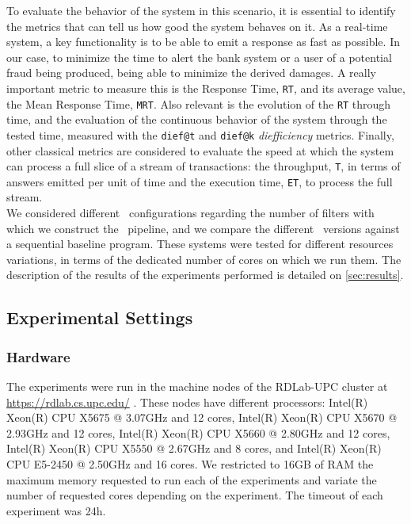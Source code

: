 To evaluate the behavior of the system in this scenario, it is essential to identify the metrics that can tell us how good the system behaves on it. As a real-time system, a key functionality is to be able to emit a response as fast as possible. In our case, to minimize the time to alert the bank system or a user of a potential fraud being produced, being able to minimize the derived damages. A really important metric to measure this is the Response Time, \texttt{RT}, and its average value, the Mean Response Time, \texttt{MRT}.
Also relevant is the evolution of the \texttt{RT} through time, and the evaluation of the continuous behavior of the system through the tested time, measured with the \texttt{dief@t} and \texttt{dief@k} \emph{diefficiency} metrics. Finally, other classical metrics are considered to evaluate the speed at which the system can process a full slice of a stream of transactions: 
the throughput, \texttt{T}, in terms of answers emitted per unit of time and the execution time, \texttt{ET}, to process the full stream. \\

We considered different \DPATM\ configurations regarding the number of filters with which we construct the \DP\ pipeline, 
and we compare the different \DP\ versions against a sequential baseline program. 
These systems were tested for different resources variations, in terms of the dedicated number of cores on which we run them. The description of the results of the experiments performed is detailed on \ref{sec:results}. 

\subsection{Experimental Settings}\label{exps:exps-settings}

\subsubsection{Hardware}

The experiments were run in the machine nodes of the RDLab-UPC cluster at \url{https://rdlab.cs.upc.edu/} \cite{rdlab-upc}. These nodes have different processors: Intel(R) Xeon(R) CPU X5675 @ 3.07GHz and 12
cores, Intel(R) Xeon(R) CPU X5670 @ 2.93GHz and 12 cores, Intel(R) Xeon(R) CPU
X5660 @ 2.80GHz and 12 cores, Intel(R) Xeon(R) CPU X5550 @ 2.67GHz and 8 cores,
and Intel(R) Xeon(R) CPU E5-2450 @ 2.50GHz and 16 cores. We restricted to 16GB of RAM the maximum memory requested to run each 
of the experiments and variate the number of requested cores depending on the experiment. The timeout of each experiment was 24h.\\

